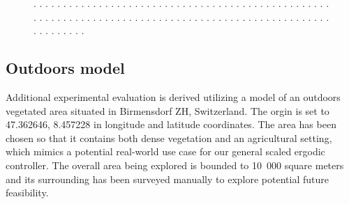 \documentclass[letterpaper,10pt,conference,twoside]{IEEEtran}
\theoremstyle{definition}
\begin{document}
\begin{figure}[t!]
  \begin{minipage}[t!]{.67\columnwidth}
    \hspace*{.1cm}
  \end{minipage}\hspace*{.6cm}
  \begin{minipage}[t!]{.25\columnwidth}
    \caption[.]{\textbf{.   }.   .   .   .   .   .   .   .   .   .   .   .   .   .   .   .   .   .   .   .   .   .   .   .   .   .   .   .   .   .   .   .   .   .   .   .   .   .   .   .   .   .   .   .   .   .   .   .   .   .   .   .   .   .   .   .   .   .   .   .   .   .   .   .   .   .   .   .   .   .   .   .   .   .   .   .   .   .   .   .   .   .   .   .   .   .   .   .   .   .   .   .   .   .   .   .   .   .   .   .   .   .   .   .   .   .   .   .   .   .   .   .   .   .   .   .   .   .   .   .   .   .   .   .   .   .   .   .   .   .   .   .   .   .   .   .   .   .   .   .   .   .   .   .   .   .   .   .   .   .   .   .   .   .   .   .   .   .   .   .   .   .   .   .   .   .   .   .   .   .   .   .   .   .   .   .   .   .   .   .   .   .   .   .   .   .   .   .   .   .   .   .   .   .   .   .   .   .   .   .   .   .   .   .   .   .   .   .   .   .   .   .   .   .   .   .   .   .   .   .   .   .   .   .   .   .   .   .   .   .   .   .   .   .   .   .   .   .   .   .   .   .   .}
    \vspace*{-.2cm}
    \label{fig:2}
  \end{minipage}
  \vspace*{-.2cm}
  \caption*{\footnotesize .   .   .   .   .   .   .   .   .   .   .   .   .   .   .   .   .   .   .   .   .   .   .   .   .   .   .   .   .   .   .   .   .   .   .   .   .   .   .   .   .   .   .   .   .   .   .   .   .   .   .   .   .   .   .   .   .   .   .   .   .   .   .   .   .   .   .   .   .   .   .   .   .   .   .   .   .   .   .   .   .   .   .   .   .   .   .   .   .   .   .   .   .   .   .   .   .   .   .   .   .   .   .   .   .   .   .   .   .}
\end{figure}

\subsection{Outdoors model}\label{sec:res3}
\noindent
Additional experimental evaluation is derived utilizing a model of an outdoors vegetated area situated in Birmensdorf ZH, Switzerland. The orgin is set to 47.362646, 8.457228 in longitude and latitude coordinates. The area has been chosen so that it contains both dense vegetation and an agricultural setting, which mimics a potential real-world use case for our general scaled ergodic controller. The overall area being explored is bounded to 10~000 square meters and its surrounding has been surveyed manually to explore potential future feasibility.
\end{document}
